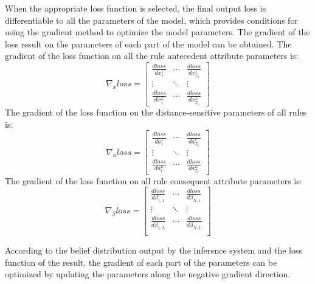 \documentclass{ieeeaccess}
\begin{document}
When the appropriate loss function is selected, the final output loss is differentiable to all the parameters of the model,
which provides conditions for using the gradient method to optimize the model parameters.
The gradient of the loss result on the parameters of each part of the model can be obtained.
The gradient of the loss function on all the rule antecedent attribute parameters is:
\begin{equation}
    \nabla_{x}loss=\left[\begin{matrix}
            \frac{dloss}{dx_1^1} & \cdots & \frac{dloss}{dx_{T_k}^1} \\
            \vdots               & \ddots & \vdots                   \\
            \frac{dloss}{dx_1^L} & \cdots & \frac{dloss}{dx_{T_k}^L}
        \end{matrix}\right]
\end{equation}
The gradient of the loss function on the distance-sensitive parameters of all rules is:
\begin{equation}
    \nabla_{a}loss=\left[\begin{matrix}
            \frac{dloss}{da_1^1} & \cdots & \frac{dloss}{da_{T_k}^1} \\
            \vdots               & \ddots & \vdots                   \\
            \frac{dloss}{da_1^L} & \cdots & \frac{dloss}{da_{T_k}^L}
        \end{matrix}\right]
\end{equation}
The gradient of the loss function on all rule consequent attribute parameters is:
\begin{equation}
    \nabla_{\beta}loss=\left[\begin{matrix}
            \frac{dloss}{d\beta_{1,1}} & \cdots & \frac{dloss}{d\beta_{N,1}} \\
            \vdots                     & \ddots & \vdots                     \\
            \frac{dloss}{d\beta_{1,L}} & \cdots & \frac{dloss}{d\beta_{N,L}} \\
        \end{matrix}\right]
\end{equation}

According to the belief distribution output by the inference system and the loss function of the result,
the gradient of each part of the parameters can be optimized by updating the parameters along the negative gradient direction.
\end{document}
